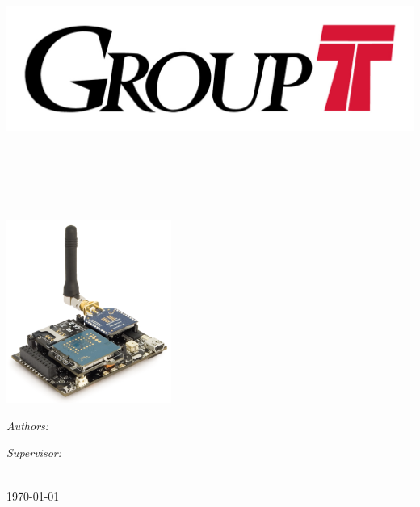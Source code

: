 \documentclass[10pt, a4paper, oneside]{Thesis} %
\begin{document}
\begin{titlepage}
\begin{center}
\includegraphics{Logo}\\[1.5cm] %
\textsc{\LARGE \univname}\\[2cm] %

\HRule \\[0.5cm] %
\begin{spacing}{2.0}
{\huge \bfseries \ttitle}\\[0.1cm] %
\end{spacing}
\HRule \\[1.0cm] %

\includegraphics[height=6cm]{waspmote} \\[1.0cm] 

\begin{minipage}{0.4\textwidth}
\begin{flushleft} \large
\emph{Authors:}\\
{\authornames}
\end{flushleft}
\end{minipage}
\begin{minipage}{0.4\textwidth}
\begin{flushright} \large
\emph{Supervisor:} \\
{\supname}
\end{flushright}
\end{minipage}\\[2cm]

{\large \today}\\%

\vfill
\end{center}
\end{titlepage}
\end{document}
